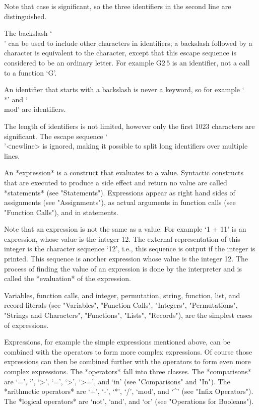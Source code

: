Note that case is significant, so the three identifiers in the second
line are distinguished.

The backslash `\\' can be used to include other characters in identifiers;
a backslash followed by a character is equivalent  to the character,
except that this escape sequence is considered to be an ordinary letter.
For example
\begintt
G\(2\,5\)
\endtt
is an identifier, not a call to a function `G'.

An identifier that starts with a backslash is never a keyword, so for
example `\\*' and `\\mod' are identifiers.

The length of identifiers is not limited,  however only the first 1023
characters are significant. The escape sequence `\\'<newline> is ignored,
making it possible to split long identifiers over multiple lines.


An *expression* is a construct that evaluates to a value.  Syntactic
constructs that are executed to produce a side effect and return no value
are called *statements* (see "Statements"). Expressions appear as right
hand sides of assignments (see "Assignments"), as actual arguments in
function calls (see "Function Calls"), and in statements.

Note that an expression is not the same as a value. For example `1 + 11'
is an  expression, whose value is  the  integer 12.  The external
representation of this integer is the character sequence `12', i.e., this
sequence is output if the integer is printed. This sequence is another
expression whose value is the integer 12.  The process of finding the
value of an expression is done by the interpreter and is called the
*evaluation* of the expression.

Variables, function calls, and integer, permutation, string, function,
list, and record literals (see "Variables", "Function Calls", "Integers",
"Permutations",  "Strings  and  Characters",  "Functions",  "Lists",
"Records"), are the simplest cases of expressions.

Expressions, for example the simple expressions mentioned above, can be
combined with the operators to form more complex expressions. Of course
those expressions can then be combined further with the operators to form
even more complex expressions. The *operators* fall into three classes.
The *comparisons* are `=', `\<', `\<>', `\<=', `>',  `>=', and `in' (see
"Comparisons" and "In"). The *arithmetic operators* are `+', `-', `*',
`/', `mod', and `^'  (see "Infix Operators").  The *logical operators* are
`not', `and', and `or' (see "Operations for Booleans").

